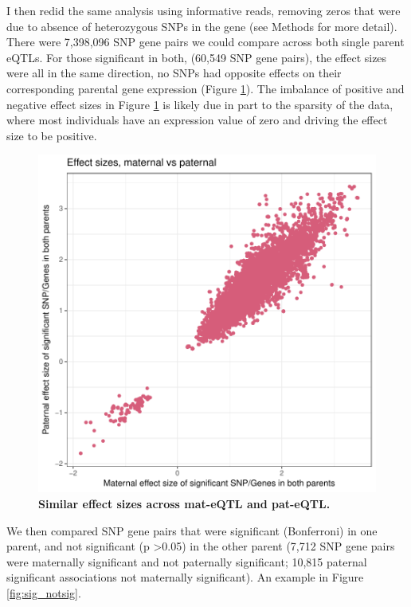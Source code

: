 I then redid the same analysis using informative reads, removing zeros that were due to absence of heterozygous SNPs in the gene (see Methods for more detail). There were 7,398,096 SNP gene pairs we could compare across both single parent eQTLs. For those significant in both, (60,549 SNP gene pairs), the effect sizes were all in the same direction, no SNPs had opposite effects on their corresponding parental gene expression (Figure \ref{fig:effectsizes}). The imbalance of positive and negative effect sizes in Figure \ref{fig:effectsizes} is likely due in part to the sparsity of the data, where most individuals have an expression value of zero and driving the effect size to be positive.

\begin{figure}[!htb]
\centering \includegraphics[width=5in]{img/ch04/fig-06-effectsizes.pdf}
\caption[Similar effect sizes across mat-eQTL and pat-eQTL.]{\textbf{Similar effect sizes across mat-eQTL and pat-eQTL.} }
\label{fig:effectsizes}
\end{figure}


We then compared SNP gene pairs that were significant (Bonferroni) in one parent, and not significant (p \textgreater 0.05) in the other parent (7,712 SNP gene pairs were maternally significant and not paternally significant; 10,815 paternal significant associations not maternally significant). An example in Figure \ref{fig:sig_notsig}. 


